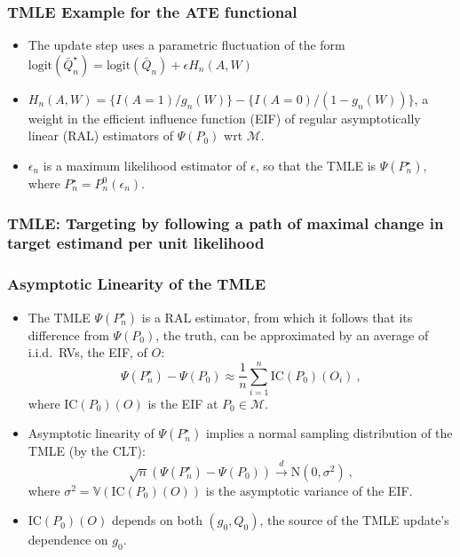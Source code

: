 \documentclass[t]{beamer}
\begin{document}
\begin{frame}
  \frametitle{TMLE Example for the ATE functional}
  \begin{itemize}
    \itemsep4pt
    \item The update step uses a parametric fluctuation of the form
      $\text{logit}(\bar{Q}_n^{\star}) = \text{logit}(\bar{Q}_n) + \epsilon
      H_n(A,W)$
    \item $H_n(A,W) = \{I(A = 1) / g_n(W)\} - \{I(A = 0) / (1 - g_n(W))\}$,
      a weight in the efficient influence function (EIF) of regular
      asymptotically linear (RAL) estimators of $\Psi(P_0)$ wrt $\mathcal{M}$.
    \item $\epsilon_n$ is a maximum likelihood estimator of $\epsilon$, so that
      the TMLE is $\Psi(P_n^{\star})$, where $P_n^{\star} = P_n^0(\epsilon_n)$.
  \end{itemize}
\end{frame}

\begin{frame}
\frametitle{TMLE: Targeting by following a path of maximal change in target estimand per unit likelihood}
\vspace{-12pt}
\centering
\begin{figure}
\centering
{}
\end{figure}
\end{frame}

\begin{frame}
  \frametitle{Asymptotic Linearity of the TMLE}
  \begin{itemize}
    \item The TMLE $\Psi(P_n^{\star})$ is a RAL estimator, from which it follows
      that its difference from $\Psi(P_0)$, the truth, can be approximated by
      an average of i.i.d.~RVs, the EIF, of $O$:
      $$\Psi(P_n^{\star}) - \Psi(P_0) \approx \frac{1}{n}\sum_{i=1}^n
        \text{IC}(P_0)(O_i) \ ,$$ where $\text{IC}(P_0)(O)$ is the EIF at
        $P_0 \in \mathcal{M}$.
    \item Asymptotic linearity of $\Psi(P_n^{\star})$ implies a normal sampling
      distribution of the TMLE (by the CLT):
      $$\sqrt{n}(\Psi(P_n^{\star}) - \Psi(P_0)) \xrightarrow{d} \text{N}(0,
        \sigma^2) \ ,$$ where $\sigma^2 = \mathbb{V}(\text{IC}(P_0)(O))$ is the
        asymptotic variance of the EIF.
    \item $\text{IC}(P_0)(O)$ depends on both $(g_0, Q_0)$, the source of the
      TMLE update's dependence on $g_0$.
  \end{itemize}
\end{frame}
\end{document}
